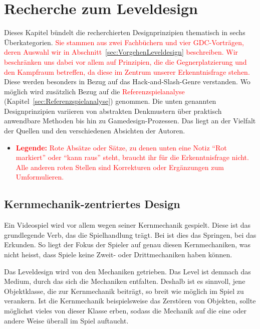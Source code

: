 \documentclass[../Main.tex]{subfiles}
\begin{document}
\section{Recherche zum Leveldesign} \label{sec:Leveldesign}
Dieses Kapitel bündelt die recherchierten Designprinzipien thematisch in sechs Überkategorien. \textcolor{red}{Sie stammen aus zwei Fachbüchern und vier GDC-Vorträgen, deren Auswahl wir in Abschnitt~\ref{sec:VorgehenLeveldesign} beschreiben. Wir beschränken uns dabei vor allem auf Prinzipien, die die Gegnerplatzierung und den Kampfraum betreffen, da diese im Zentrum unserer Erkenntnisfrage stehen.} Diese werden besonders in Bezug auf das Hack-and-Slash-Genre verstanden. Wo möglich wird zusätzlich Bezug auf die \textcolor{red}{Referenzspielanalyse} (Kapitel~\ref{sec:Referenzspielanalyse}) genommen. Die unten genannten Designprinzipien variieren von abstrakten Denkmustern über praktisch anwendbare Methoden bis hin zu Gamedesign-Prozessen. Das liegt an der Vielfalt der Quellen und den verschiedenen Absichten der Autoren.
\begin{itemize}[leftmargin=1.5cm]
    \item \textcolor{red}{\textbf{Legende:} Rote Absätze oder Sätze, zu denen unten eine Notiz \enquote{Rot markiert} oder \enquote{kann raus} steht, braucht ihr für die Erkenntnisfrage nicht. Alle anderen roten Stellen sind Korrekturen oder Ergänzungen zum Umformulieren.}
\end{itemize}

\subsection{Kernmechanik-zentriertes Design} \label{sec:Kernmechanik}

Ein Videospiel wird vor allem wegen seiner Kernmechanik gespielt. Diese ist das grundlegende Verb, das die Spielhandlung trägt.\autocite[110]{totten2014architectural} Bei  ist dies das Springen, bei  das Erkunden.\autocite{nintendo_supermariobros_1985,nintendo_zelda_1986} So liegt der Fokus der Spieler auf genau diesen Kernmechaniken, was nicht heisst, dass Spiele keine Zweit- oder Drittmechaniken haben können.

Das Leveldesign wird von den Mechaniken getrieben. Das Level ist demnach das Medium, durch das sich die Mechaniken entfalten.\autocite{gdc_tenprinciples2010} Deshalb ist es sinnvoll, jene Objektklasse, die zur Kernmechanik beiträgt, so breit wie möglich im Spiel zu verankern. Ist die Kernmechanik beispielsweise das Zerstören von Objekten, sollte möglichst vieles von dieser Klasse erben, sodass die Mechanik auf die eine oder andere Weise überall im Spiel auftaucht.\autocite{gdc_movingmountains2020}
\end{document}
